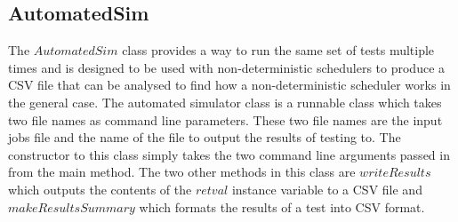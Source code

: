 \documentclass{article}
\begin{document}
\subsection{AutomatedSim}
The $AutomatedSim$ class provides a way to run the same set of tests multiple times and is designed to be used with non-deterministic schedulers to produce a CSV file that can be analysed to find how a non-deterministic scheduler works in the general case. The automated simulator class is a runnable class which takes two file names as command line parameters. These two file names are the input jobs file and the name of the file to output the results of testing to. The constructor to this class simply takes the two command line arguments passed in from the main method. The two other methods in this class are $writeResults$ which outputs the contents of the $retval$ instance variable to a CSV file and $makeResultsSummary$ which formats the results of a test into CSV format.
\end{document}
